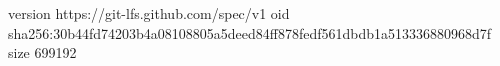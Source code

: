 version https://git-lfs.github.com/spec/v1
oid sha256:30b44fd74203b4a08108805a5deed84ff878fedf561dbdb1a513336880968d7f
size 699192
